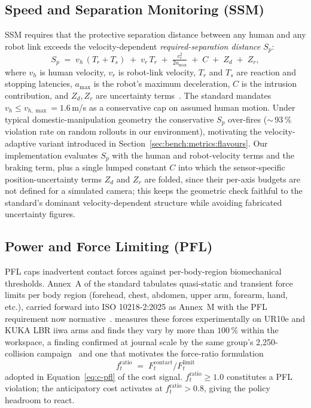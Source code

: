 \documentclass[11pt,a4paper]{report}
\newcommand{\ssm}{SSM}
\newcommand{\pfl}{PFL}
\begin{document}
\subsection{Speed and Separation Monitoring (\ssm{})}
\label{sec:bg:iso:ssm}

\ssm{} requires that the protective separation distance between any
human and any robot link exceeds the velocity-dependent
\emph{required-separation distance} $S_p$:
\begin{equation}
  S_p \;=\; v_h \,(T_r + T_s) \;+\; v_r \, T_r
     \;+\; \tfrac{v_r^2}{2 a_{\max}} \;+\; C \;+\; Z_d \;+\; Z_r,
  \label{eq:iso-ssm}
\end{equation}
where $v_h$ is human velocity, $v_r$ is robot-link velocity, $T_r$
and $T_s$ are reaction and stopping latencies, $a_{\max}$ is the
robot's maximum deceleration, $C$ is the intrusion contribution,
and $Z_d, Z_r$ are uncertainty
terms~\cite{iso15066,svarny2019unified,marvel2017implementing}.
The standard mandates $v_h \le v_{h,\max} = 1.6$\,m/s as a
conservative cap on assumed human motion. Under typical
domestic-manipulation geometry the conservative $S_p$ over-fires
($\sim$\,93\,\% violation rate on random rollouts in our
environment), motivating the velocity-adaptive variant introduced in
Section~\ref{sec:bench:metrics:flavours}. Our implementation
evaluates $S_p$ with the human and robot-velocity terms and the
braking term, plus a single lumped constant $C$ into which the
sensor-specific position-uncertainty terms $Z_d$ and $Z_r$ are
folded, since their per-axis budgets are not defined for a simulated
camera; this keeps the geometric check faithful to the standard's
dominant velocity-dependent structure while avoiding fabricated
uncertainty figures.

\subsection{Power and Force Limiting (\pfl{})}
\label{sec:bg:iso:pfl}

\pfl{} caps inadvertent contact forces against per-body-region
biomechanical thresholds. Annex~A of the standard tabulates
quasi-static and transient force limits per body region
(forehead, chest, abdomen, upper arm, forearm, hand, etc.), carried
forward into ISO 10218-2:2025 as Annex~M with the \pfl{} requirement
now normative~\cite{hartmann2026iso}.
\cite{svarny2020collision} measures these forces experimentally on
UR10e and KUKA LBR iiwa arms and finds they vary by more than
$100\,\%$ within the workspace, a finding confirmed at journal scale
by the same group's 2{,}250-collision campaign~\cite{svarny2022softskins}
and one that motivates the force-ratio formulation
\begin{equation}
  f^{\mathrm{ratio}}_t \;=\; F^{\mathrm{contact}}_t /
                              F^{\mathrm{limit}}_t
  \label{eq:iso-pfl-ratio}
\end{equation}
adopted in Equation~\ref{eq:c-pfl} of the cost signal.
$f^{\mathrm{ratio}}_t \ge 1.0$ constitutes a \pfl{} violation; the
anticipatory cost activates at $f^{\mathrm{ratio}}_t > 0.8$, giving
the policy headroom to react.
\end{document}
